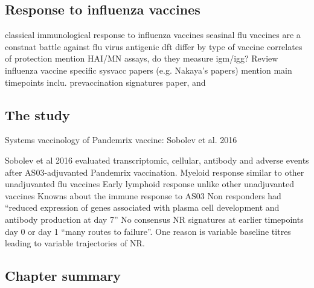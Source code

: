 \subsection{Response to influenza vaccines}

\begin{outline}
    \1 classical immunological response to influenza vaccines
        \2 seasinal flu vaccines are a constnat battle against flu virus antigenic dft
        \2 differ by type of vaccine
    \1 correlates of protection
        \2 mention HAI/MN assays, do they measure igm/igg?
    \1 Review influenza vaccine specific sysvacc papers (e.g. Nakaya's papers)
        \2 mention main timepoints
        \2 inclu. prevaccination signatures paper, and
\end{outline}

\subsection{The  study}

\begin{outline}

\1 Systems vaccinology of Pandemrix vaccine: Sobolev et al. 2016

    \2 Sobolev et al 2016 evaluated transcriptomic, cellular, antibody and adverse events after AS03-adjuvanted Pandemrix vaccination.
        \3 Myeloid response similar to other unadjuvanted flu vaccines
        \3 Early lymphoid response unlike other unadjuvanted vaccines
            \4 Knowns about the immune response to AS03
        \3 Non responders had \enquote{reduced expression of genes associated with plasma cell development and antibody production at day 7}
        \3 No consensus NR signatures at earlier timepoints day 0 or day 1 \enquote{many routes to failure}. One reason is variable baseline titres leading to variable trajectories of NR.

\end{outline}

\subsection{Chapter summary}

